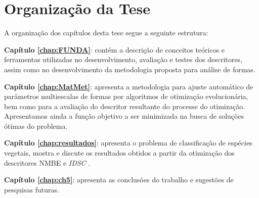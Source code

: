 \section{Organização da Tese \label{sec:org}}

A organização dos capítulos desta tese segue a seguinte estrutura:

\noindent \textbf{Capítulo \ref{chap:FUNDA}}: contém a descrição de conceitos teóricos e ferramentas utilizadas no desenvolvimento, avaliação e testes dos descritores, assim como no desenvolvimento da metodologia proposta para análise de formas.

\noindent \textbf{Capítulo \ref{chap:MatMet}}:  apresenta a metodologia para ajuste automático de parâmetros multiescalas de formas por algoritmos de otimização evolucionária, bem como para a avaliação do descritor resultante do processe do otimização. Apresentamos ainda a função objetivo a ser minimizada na busca de soluções ótimas do problema.

\noindent \textbf{Capítulo \ref{chap:resultados}}: apresenta o problema de classificação de espécies vegetais, mostra e discute os resultados obtidos a partir da otimização dos descritores NMBE e \emph{IDSC} .

\noindent \textbf{Capítulo \ref{chap:ch5}}: apresenta as conclusões do trabalho e sugestões de pesquisas futuras. 
